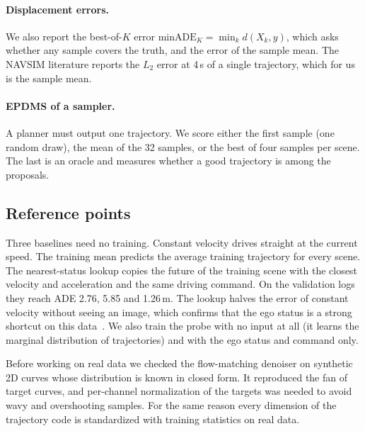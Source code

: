 \paragraph{Displacement errors.}
We also report the best-of-$K$ error $\text{minADE}_K=\min_k d(X_k,y)$, which
asks whether any sample covers the truth, and the error of the sample mean. The
NAVSIM literature reports the $L_2$ error at 4\,s of a single trajectory, which
for us is the sample mean.

\paragraph{EPDMS of a sampler.}
A planner must output one trajectory. We score either the first sample (one
random draw), the mean of the 32 samples, or the best of four samples per scene.
The last is an oracle and measures whether a good trajectory is among the
proposals.

\subsection{Reference points}
\label{sec:baselines}

Three baselines need no training. Constant velocity drives straight at the
current speed. The training mean predicts the average training trajectory for
every scene. The nearest-status lookup copies the future of the training scene
with the closest velocity and acceleration and the same driving command. On the
validation logs they reach ADE 2.76, 5.85 and 1.26\,m. The lookup halves the
error of constant velocity without seeing an image, which confirms that the ego
status is a strong shortcut on this data~\cite{egostatus}. We also train the probe
with no input at all (it learns the marginal distribution of trajectories) and
with the ego status and command only.

Before working on real data we checked the flow-matching denoiser on synthetic
2D curves whose distribution is known in closed form. It reproduced the fan of
target curves, and per-channel normalization of the targets was needed to avoid
wavy and overshooting samples. For the same reason every dimension of the
trajectory code is standardized with training statistics on real data.
